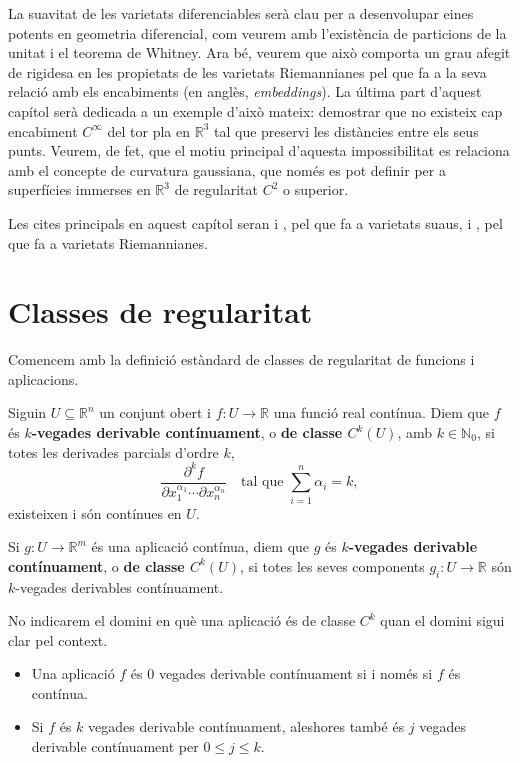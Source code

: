 La suavitat de les varietats diferenciables serà clau per a desenvolupar eines potents en geometria diferencial, com veurem amb l'existència de particions de la unitat i el teorema de Whitney. Ara bé, veurem que això comporta un grau afegit de rigidesa en les propietats de les varietats Riemannianes pel que fa a la seva relació amb els encabiments (en anglès, \textit{embeddings}). La última part d'aquest capítol serà dedicada a un exemple d'això mateix: demostrar que no existeix cap encabiment  $C^\infty$ del tor pla en $\mathbb R^3$ tal que preservi les distàncies entre els seus punts. Veurem, de fet, que el motiu principal d'aquesta impossibilitat es relaciona amb el concepte de curvatura gaussiana, que només es pot definir per a superfícies immerses en $\mathbb R^3$ de regularitat $C^2$ o superior. 

{\color{blue} Les cites principals en aquest capítol seran \cite{lee2013} i \cite{warner1983}, pel que fa a varietats suaus, i \cite{chavel2006}, pel que fa a varietats Riemannianes.}

\section{Classes de regularitat}
Comencem amb la definició estàndard de classes de regularitat de funcions i aplicacions.
\begin{defi}
    Siguin $U\subseteq\mathbb R^n$ un conjunt obert i $f:U\to\mathbb R$ una funció real contínua.
    Diem que $f$ és \textbf{ $k$-vegades derivable contínuament}, o \textbf{de classe $C^k(U)$}, amb $k\in\mathbb N_0$, si totes les derivades parcials d'ordre $k$, \begin{equation*}
        \frac{\partial^k f}{\partial x_1^{\alpha_1}\cdots\partial x_n^{\alpha_n}}\quad\text{tal que }\sum_{i=1}^n\alpha_i = k,
    \end{equation*} existeixen i són contínues en $U$.

    Si $g:U\to\mathbb R^m$ és una aplicació contínua, diem que $g$ és \textbf{ $k$-vegades derivable contínuament}, o \textbf{de classe $C^k(U)$}, si totes les seves components $g_i:U\to\mathbb R$ són $k$-vegades derivables contínuament.
\end{defi}
\begin{nota}
    No indicarem el domini en què una aplicació és de classe $C^k$ quan el domini sigui clar pel context.
\end{nota}

\begin{obss}
\end{obss}
\begin{itemize}
    \item Una aplicació $f$ és $0$ vegades derivable contínuament si i només si $f$ és contínua. 
    \item Si $f$ és $k$ vegades derivable contínuament, aleshores també és $j$ vegades derivable contínuament per $0\le j\le k$.
\end{itemize}

